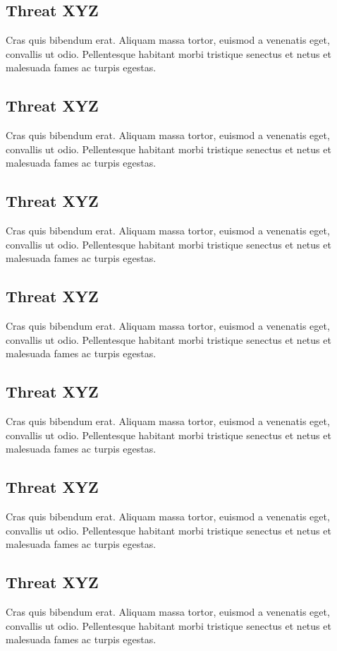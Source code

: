 \documentclass[runningheads]{llncs}
\begin{document}
\subsection{Threat XYZ}
Cras quis bibendum erat. Aliquam massa tortor, euismod a venenatis eget,
convallis ut odio. Pellentesque habitant morbi tristique senectus et netus et
malesuada fames ac turpis egestas.
%
\subsection{Threat XYZ}
Cras quis bibendum erat. Aliquam massa tortor, euismod a venenatis eget,
convallis ut odio. Pellentesque habitant morbi tristique senectus et netus et
malesuada fames ac turpis egestas.
%
\subsection{Threat XYZ}
Cras quis bibendum erat. Aliquam massa tortor, euismod a venenatis eget,
convallis ut odio. Pellentesque habitant morbi tristique senectus et netus et
malesuada fames ac turpis egestas.
%
\subsection{Threat XYZ}
Cras quis bibendum erat. Aliquam massa tortor, euismod a venenatis eget,
convallis ut odio. Pellentesque habitant morbi tristique senectus et netus et
malesuada fames ac turpis egestas.
%
\subsection{Threat XYZ}
Cras quis bibendum erat. Aliquam massa tortor, euismod a venenatis eget,
convallis ut odio. Pellentesque habitant morbi tristique senectus et netus et
malesuada fames ac turpis egestas.
%
\subsection{Threat XYZ}
Cras quis bibendum erat. Aliquam massa tortor, euismod a venenatis eget,
convallis ut odio. Pellentesque habitant morbi tristique senectus et netus et
malesuada fames ac turpis egestas.
%
\subsection{Threat XYZ}
Cras quis bibendum erat. Aliquam massa tortor, euismod a venenatis eget,
convallis ut odio. Pellentesque habitant morbi tristique senectus et netus et
malesuada fames ac turpis egestas.
%
\end{document}
